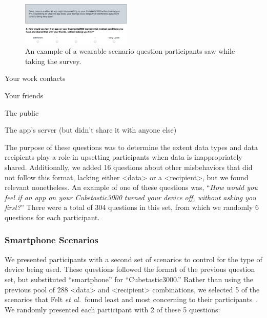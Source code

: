 \documentclass{acm_proc_article-sp}
\def\etal{{\it et al.~}}
\newenvironment{packed_item}{
\begin{itemize}
  \setlength{\itemsep}{1pt}
  \setlength{\parskip}{0pt}
  \setlength{\parsep}{0pt}
}{\end{itemize}}
\begin{document}
\begin{figure}[t]
	\centering
	\includegraphics[width=0.47\textwidth]{prompt.pdf}
	\caption{An example of a wearable scenario question participants saw while taking the survey.}
	\label{fig:prompt}
\end{figure}

\begin{packed_item}
\item Your work contacts
\item Your friends
\item The public
\item The app's server (but didn't share it with anyone else)\\[-.8cm]
\end{packed_item}

The purpose of these questions was to determine the extent data types and data recipients play a role in upsetting participants when data is inappropriately shared. Additionally, we added 16 questions about other misbehaviors that did not follow this format, lacking either <data> or a <recipient>, but we found relevant nonetheless. An example of one of these questions was, ``\textit{How would you feel if an app on your Cubetastic3000 turned your device off, without asking you first?}'' There were a total of 304 questions in this set, from which we randomly 6 questions for each participant.

\subsubsection{Smartphone Scenarios}
\label{sec:smartphones}
We presented participants with a second set of scenarios to control for the type of device being used. These questions followed the format of the previous question set, but substituted ``smartphone'' for ``Cubetastic3000.'' Rather than using the previous pool of 288 <data> and <recipient> combinations, we selected 5 of the scenarios that Felt \etal found least and most concerning to their participants~\cite{Felt}. We randomly presented each participant with 2 of these 5 questions: \\[-.8cm]
\end{document}
